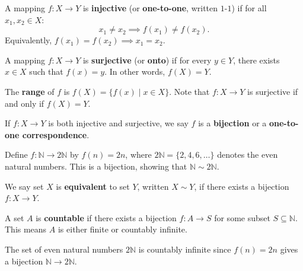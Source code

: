 \documentclass[11pt]{report}
\begin{document}
\begin{defbox}
A mapping $f: X \to Y$ is \textbf{injective} (or \textbf{one-to-one}, written $1$-$1$) if for all $x_1, x_2 \in X$:
\[
x_1 \neq x_2 \implies f(x_1) \neq f(x_2).
\]
Equivalently, $f(x_1) = f(x_2) \implies x_1 = x_2$.
\end{defbox}

\begin{defbox}
A mapping $f: X \to Y$ is \textbf{surjective} (or \textbf{onto}) if for every $y \in Y$, there exists $x \in X$ such that $f(x) = y$. In other words, $f(X) = Y$.
\end{defbox}

\begin{defbox}[Range]
The \textbf{range} of $f$ is $f(X) = \{f(x) \mid x \in X\}$. Note that $f: X \to Y$ is surjective if and only if $f(X) = Y$.
\end{defbox}

\begin{defbox}[Bijection]
If $f: X \to Y$ is both injective and surjective, we say $f$ is a \textbf{bijection} or a \textbf{one-to-one correspondence}.
\end{defbox}

\begin{exbox}
Define $f: \mathbb{N} \to 2\mathbb{N}$ by $f(n) = 2n$, where $2\mathbb{N} = \{2, 4, 6, \ldots\}$ denotes the even natural numbers. This is a bijection, showing that $\mathbb{N} \sim 2\mathbb{N}$.
\end{exbox}

\begin{defbox}
We say set $X$ is \textbf{equivalent} to set $Y$, written $X \sim Y$, if there exists a bijection $f: X \to Y$.
\end{defbox}

\begin{defbox}
A set $A$ is \textbf{countable} if there exists a bijection $f: A \to S$ for some subset $S \subseteq \mathbb{N}$. This means $A$ is either finite or countably infinite.
\end{defbox}

\begin{exbox}
The set of even natural numbers $2\mathbb{N}$ is countably infinite since $f(n) = 2n$ gives a bijection $\mathbb{N} \to 2\mathbb{N}$.
\end{exbox}
\end{document}
